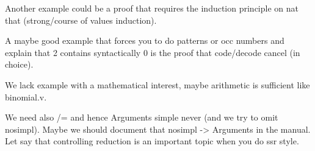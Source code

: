 Another example could be a proof that requires the induction principle on nat that (strong/course of values induction).

A maybe good example that forces you to do patterns or occ numbers and explain
that 2  contains syntactically 0 is the proof that code/decode cancel (in
choice).

We lack example with a mathematical interest, maybe arithmetic is sufficient like binomial.v.

We need also /= and hence Arguments simple never (and we try to omit nosimpl).
Maybe we should document that nosimpl -> Arguments in the manual.
Let say that controlling reduction is an important topic when you
do ssr style.
